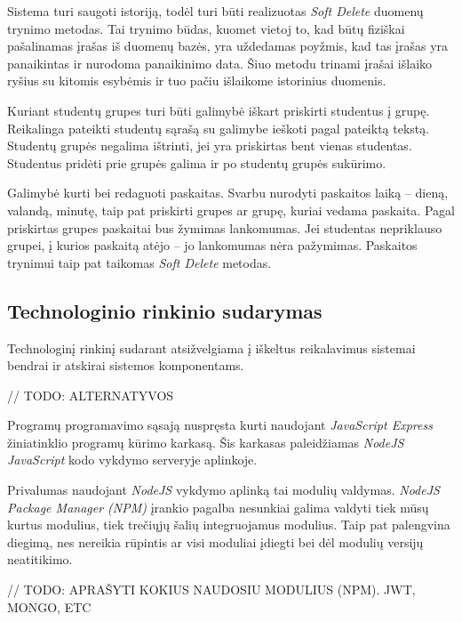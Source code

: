 \documentclass{VUMIFPSbakalaurinis}
\begin{document}
Sistema turi saugoti istoriją, todėl turi būti realizuotas \textit{Soft Delete} duomenų trynimo metodas. Tai trynimo būdas, kuomet vietoj to, kad būtų fiziškai pašalinamas įrašas iš duomenų bazės, yra uždedamas poyžmis, kad tas įrašas yra panaikintas ir nurodoma panaikinimo data. Šiuo metodu trinami įrašai išlaiko ryšius su kitomis esybėmis ir tuo pačiu išlaikome istorinius duomenis.


Kuriant studentų grupes turi būti galimybė iškart priskirti studentus į grupę. Reikalinga pateikti studentų sąrašą su galimybe ieškoti pagal pateiktą tekstą. Studentų grupės negalima ištrinti, jei yra priskirtas bent vienas studentas. Studentus pridėti prie grupės galima ir po studentų grupės sukūrimo.


Galimybė kurti bei redaguoti paskaitas. Svarbu nurodyti paskaitos laiką – dieną, valandą, minutę, taip pat priskirti grupes ar grupę, kuriai vedama paskaita. Pagal priskirtas grupes paskaitai bus žymimas lankomumas. Jei studentas nepriklauso grupei, į kurios paskaitą atėjo – jo lankomumas nėra pažymimas. Paskaitos trynimui taip pat taikomas \textit{Soft Delete} metodas.

\subsection{Technologinio rinkinio sudarymas}

Technologinį rinkinį sudarant atsižvelgiama į iškeltus reikalavimus sistemai bendrai ir atskirai sistemos komponentams.

// TODO: ALTERNATYVOS

Programų programavimo sąsają nuspręsta kurti naudojant \textit{JavaScript Express} žiniatinklio programų kūrimo karkasą. Šis karkasas paleidžiamas \textit{NodeJS} \textit{JavaScript} kodo vykdymo serveryje aplinkoje.

Privalumas naudojant \textit{NodeJS} vykdymo aplinką tai modulių valdymas. \textit{NodeJS Package Manager (NPM)} įrankio pagalba nesunkiai galima valdyti tiek mūsų kurtus modulius, tiek trečiųjų šalių integruojamus modulius. Taip pat palengvina diegimą, nes nereikia rūpintis ar visi moduliai įdiegti bei dėl modulių versijų neatitikimo.

// TODO: APRAŠYTI KOKIUS NAUDOSIU MODULIUS (NPM). JWT, MONGO, ETC
\end{document}
